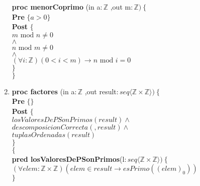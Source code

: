 \documentclass[a4paper]{article}
\begin{document}
\begin{enumerate}[label=\alph*)]
			\textbf{proc menorCoprimo }(in a$:\mathbb{Z}$
				,out m$:\mathbb{Z} )\ \{$\smallskip \\
			\hspace*{6mm} \textbf{Pre }$\{a>0 \}$\smallskip \\
			\hspace*{6mm} \textbf{Post }$\{$\\
			\hspace*{6mm} $m\textrm{ mod }n\neq 0$\\
			\hspace*{6mm} $\wedge$\\
			\hspace*{6mm} $n\textrm{ mod }m\neq 0$\\
			\hspace*{6mm} $\wedge$\\
			\hspace*{6mm} $(\forall i:\mathbb{Z})(0<i<m)\rightarrow n\textrm{ mod }i= 0$\\
			\hspace*{6mm} $\}$\\
			$\}$\smallskip \\
				
			
		\item 
			
			\textbf{proc factores }(in a$:\mathbb{Z}$
				,out result$:seq\langle \mathbb{Z} \times \mathbb{Z}\rangle )\ \{$\smallskip \\
			\hspace*{6mm} \textbf{Pre }$\{ \}$\smallskip \\
			\hspace*{6mm} \textbf{Post }$\{$\\
			\hspace*{6mm} $losValoresDePSonPrimos(result)\wedge$\\
			\hspace*{6mm} $descomposicionCorrecta(,result)\wedge$\\
			\hspace*{6mm} $tuplasOrdenadas(result)$\\
			\hspace*{6mm} $\}$\\
			$\{$\smallskip \\
			
			\textbf{pred losValoresDePSonPrimos}(l$:seq\langle \mathbb{Z} \times \mathbb{Z}
			\rangle)\ \{$\smallskip \\
			\hspace*{6mm}$(\forall elem:\mathbb{Z}\times \mathbb{Z})
				(elem\in result\rightarrow esPrimo((elem)_0))$\\
			$\}$\smallskip \\
			

\end{enumerate}
\end{document}
